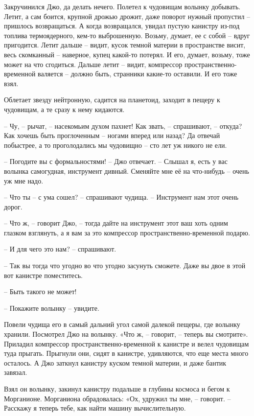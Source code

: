 \documentclass[ebook,oneside,final,openright]{memoir}
\begin{document}
\par
Закручинился Джо, да делать нечего. Полетел к чудовищам волынку добывать. Летит, а сам боится, крупной дрожью дрожит, даже поворот нужный пропустил – пришлось возвращаться. А когда возвращался, увидал пустую канистру из-под топлива термоядерного, кем-то выброшенную. Возьму, думает, ее с собой – вдруг пригодится. Летит дальше – видит, кусок темной материи в пространстве висит, весь скомканный – наверное, купец какой-то потерял. И его, думает, возьму, тоже может на что сгодиться. Дальше летит – видит, компрессор пространственно-временной валяется – должно быть, странники какие-то оставили. И его тоже взял.\par
\par
Облетает звезду нейтронную, садится на планетоид, заходит в пещеру к чудовищам, а те сразу к нему кидаются. \par
– Чу, – рычат, – насекомьим духом пахнет! Как звать, – спрашивают, – откуда? Как хочешь быть проглоченным – ногами вперед или назад? Да отвечай побыстрее, а то проголодались мы чудовищно – сто лет уж никого не ели.\par
– Погодите вы с формальностями! – Джо отвечает. – Слышал я, есть у вас волынка самогудная, инструмент дивный. Сменяйте мне её на что-нибудь – очень уж мне надо.\par
– Что ты – с ума сошел? – спрашивают чудища. – Инструмент нам этот очень дорог.\par
– Что ж, – говорит Джо, – тогда дайте на инструмент этот ваш хоть одним глазком взглянуть, а я вам за это компрессор пространственно-временной подарю.\par
– И для чего это нам? – спрашивают.\par
– Так вы тогда что угодно во что угодно засунуть сможете. Даже вы двое в этой вот канистре поместитесь. \par
– Быть такого не может!\par
– Покажите волынку – увидите.\par
\par
Повели чудища его в самый дальний угол самой далекой пещеры, где волынку хранили. Посмотрел Джо на волынку. «Что ж, – говорит, – теперь вы смотрите». Приладил компрессор пространственно-временной к канистре и велел чудовищам туда прыгать. Прыгнули они, сидят в канистре, удивляются, что еще места много осталось. А Джо заткнул канистру куском темной материи, и даже бантик завязал.\par
\par
Взял он волынку, закинул канистру подальше в глубины космоса и бегом к Морганионе. Морганиона обрадовалась: «Ох, удружил ты мне, – говорит. – Расскажу я теперь тебе, как найти машину вычислительную.\par
\end{document}
